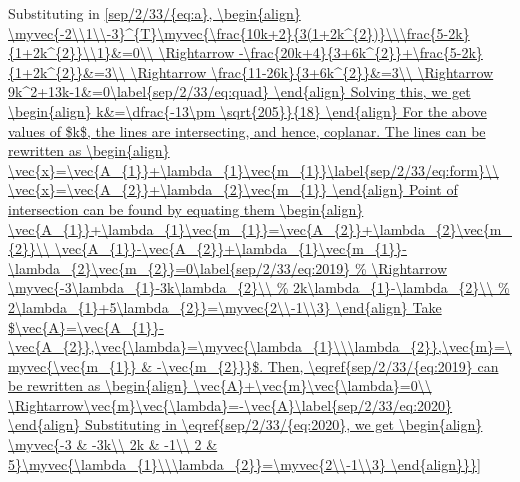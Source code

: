 Substituting in \eqref{sep/2/33/{eq:a},
\begin{align}
    \myvec{-2\\1\\-3}^{T}\myvec{\frac{10k+2}{3(1+2k^{2})}\\\frac{5-2k}{1+2k^{2}}\\1}&=0\\
    \Rightarrow -\frac{20k+4}{3+6k^{2}}+\frac{5-2k}{1+2k^{2}}&=3\\
    \Rightarrow \frac{11-26k}{3+6k^{2}}&=3\\
    \Rightarrow 9k^2+13k-1&=0\label{sep/2/33/eq:quad}
\end{align}
Solving this, we get
\begin{align}
    k&=\dfrac{-13\pm \sqrt{205}}{18}
\end{align}
For the above values of $k$, the lines are intersecting, and hence, coplanar. The lines can be rewritten as
\begin{align}
    \vec{x}=\vec{A_{1}}+\lambda_{1}\vec{m_{1}}\label{sep/2/33/eq:form}\\
    \vec{x}=\vec{A_{2}}+\lambda_{2}\vec{m_{1}}
\end{align}
Point of intersection can be found by equating them
\begin{align}
    \vec{A_{1}}+\lambda_{1}\vec{m_{1}}=\vec{A_{2}}+\lambda_{2}\vec{m_{2}}\\
    \vec{A_{1}}-\vec{A_{2}}+\lambda_{1}\vec{m_{1}}-\lambda_{2}\vec{m_{2}}=0\label{sep/2/33/eq:2019}
\end{align}
Take $\vec{A}=\vec{A_{1}}-\vec{A_{2}},\vec{\lambda}=\myvec{\lambda_{1}\\\lambda_{2}},\vec{m}=\myvec{\vec{m_{1}} & -\vec{m_{2}}}$. Then, \eqref{sep/2/33/{eq:2019} can be rewritten as
\begin{align}
    \vec{A}+\vec{m}\vec{\lambda}=0\\
    \Rightarrow\vec{m}\vec{\lambda}=-\vec{A}\label{sep/2/33/eq:2020}
\end{align}
Substituting in \eqref{sep/2/33/{eq:2020}, we get
\begin{align}
    \myvec{-3 & -3k\\
    2k & -1\\
    2 &  5}\myvec{\lambda_{1}\\\lambda_{2}}=\myvec{2\\-1\\3}

\end{align}}}}
